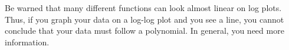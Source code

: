 Be warned that many different functions can look almost linear on log plots. 
Thus, if you graph your data on a log-log plot and you see a line, you cannot conclude that your data must follow a polynomial. 
In general, you need more information.


